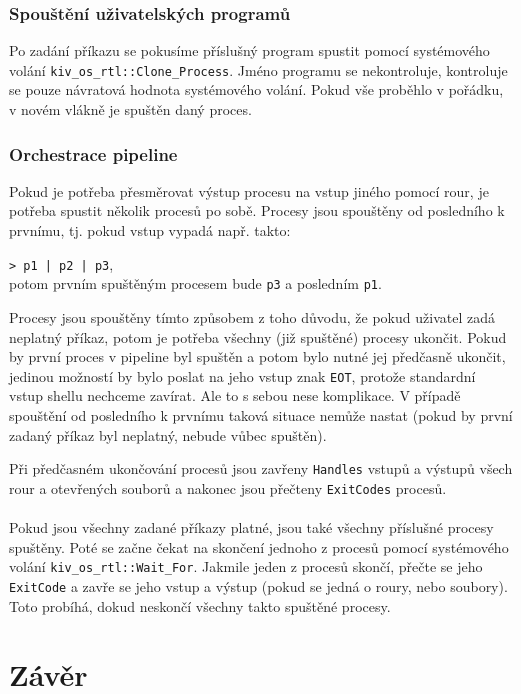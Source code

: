 \documentclass[12pt, a4paper]{article}
\let\oldsection\section
\renewcommand\section{\clearpage\oldsection}
\begin{document}
	
	\subsubsection{Spouštění uživatelských programů}
	Po zadání příkazu se pokusíme příslušný program spustit pomocí systémového volání \texttt{kiv_os_rtl::Clone_Process}. Jméno programu se nekontroluje, kontroluje se pouze návratová hodnota systémového volání. Pokud vše proběhlo v pořádku, v novém vlákně je spuštěn daný proces.
	
	\subsubsection{Orchestrace pipeline} 
	Pokud je potřeba přesměrovat výstup procesu na vstup jiného pomocí rour, je potřeba spustit několik procesů po sobě. Procesy jsou spouštěny od posledního k prvnímu, tj. pokud vstup vypadá např. takto:
	
	
	\texttt{> p1 | p2 | p3},\\
	potom prvním spuštěným procesem bude \texttt{p3} a posledním \texttt{p1}.
	
	Procesy jsou spouštěny tímto způsobem z toho důvodu, že pokud uživatel zadá neplatný příkaz, potom je potřeba všechny (již spuštěné) procesy ukončit. Pokud by první proces v pipeline byl spuštěn a potom bylo nutné jej předčasně ukončit, jedinou možností by bylo poslat na jeho vstup znak \texttt{EOT}, protože standardní vstup shellu nechceme zavírat. Ale to s sebou nese komplikace. V případě spouštění od posledního k prvnímu taková situace nemůže nastat (pokud by první zadaný příkaz byl neplatný, nebude vůbec spuštěn).
	
	Při předčasném ukončování procesů jsou zavřeny \texttt{Handles} vstupů a výstupů všech rour a otevřených souborů a nakonec jsou přečteny \texttt{ExitCodes} procesů.
	\\
	\\
	Pokud jsou všechny zadané příkazy platné, jsou také všechny příslušné procesy spuštěny. Poté se začne čekat na skončení jednoho z procesů pomocí systémového volání \texttt{kiv_os_rtl::Wait_For}. Jakmile jeden z procesů skončí, přečte se jeho \texttt{ExitCode} a zavře se jeho vstup a výstup (pokud se jedná o roury, nebo soubory). Toto probíhá, dokud neskončí všechny takto spuštěné procesy.


\section{Závěr}	
\end{document}
